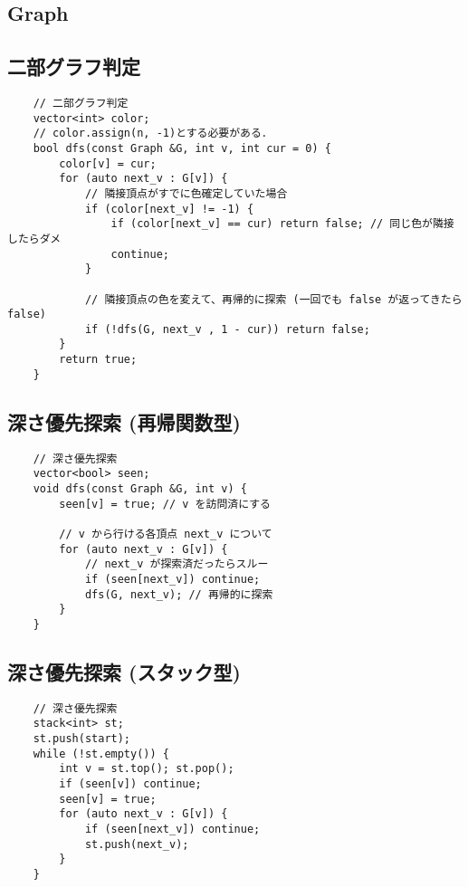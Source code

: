 \documentclass[a4paper, landscape, 9pt]{jarticle} %
\begin{document}
\begin{multicols*}{3}
    \section{Graph}

    \subsection{二部グラフ判定}
    \begin{lstlisting}
    // 二部グラフ判定
    vector<int> color;
    // color.assign(n, -1)とする必要がある．
    bool dfs(const Graph &G, int v, int cur = 0) {
        color[v] = cur;
        for (auto next_v : G[v]) {
            // 隣接頂点がすでに色確定していた場合
            if (color[next_v] != -1) {
                if (color[next_v] == cur) return false; // 同じ色が隣接したらダメ
                continue;
            }
    
            // 隣接頂点の色を変えて、再帰的に探索 (一回でも false が返ってきたら false)
            if (!dfs(G, next_v , 1 - cur)) return false;
        }
        return true;
    }
    \end{lstlisting}

    \subsection{深さ優先探索 (再帰関数型)}
    \begin{lstlisting}
    // 深さ優先探索
    vector<bool> seen;
    void dfs(const Graph &G, int v) {
        seen[v] = true; // v を訪問済にする
    
        // v から行ける各頂点 next_v について
        for (auto next_v : G[v]) { 
            // next_v が探索済だったらスルー
            if (seen[next_v]) continue;
            dfs(G, next_v); // 再帰的に探索
        }
    }
    \end{lstlisting}

    \subsection{深さ優先探索 (スタック型)}
    \begin{lstlisting}
    // 深さ優先探索
    stack<int> st;
    st.push(start);
    while (!st.empty()) {
        int v = st.top(); st.pop();
        if (seen[v]) continue;
        seen[v] = true;
        for (auto next_v : G[v]) {
            if (seen[next_v]) continue;
            st.push(next_v);
        }
    }
    \end{lstlisting}


\end{multicols*}
\end{document}
